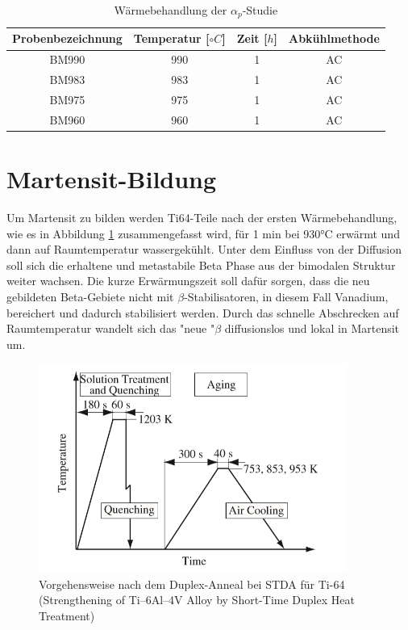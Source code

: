 \begin{table}
		\centering
	\begin{tabular}{|c|c|c|c|}
	\hline 
	Probenbezeichnung & Temperatur [$\circ C$] & Zeit [$h$] & Abkühlmethode \\ 
	\hline 
	BM990 & 990 & 1 & AC\\ 
	\hline 
	BM983 & 983 & 1 & AC\\ 
	\hline 
	BM975 & 975 & 1 & AC\\ 
	\hline 
	BM960 & 960 & 1 & AC\\ 
	\hline 
	\end{tabular} 
	\caption{Wärmebehandlung der $\alpha_p$-Studie}
	\label{tab:alphap}
\end{table}


\section{Martensit-Bildung}

Um Martensit zu bilden werden Ti64-Teile  nach der ersten Wärmebehandlung, wie es in Abbildung \ref{STDA} zusammengefasst wird, für 1 min  bei 930°C erwärmt und dann  auf Raumtemperatur wassergekühlt. Unter dem Einfluss von der Diffusion soll sich die erhaltene und metastabile Beta Phase aus der bimodalen Struktur weiter wachsen. Die kurze Erwärmungszeit soll dafür sorgen, dass die neu gebildeten Beta-Gebiete nicht mit $\beta$-Stabilisatoren, in diesem Fall Vanadium, bereichert  und dadurch stabilisiert werden. Durch das schnelle Abschrecken auf Raumtemperatur wandelt sich das "neue "$\beta$ diffusionslos und lokal in Martensit um.

\begin{figure}[H]
	\centering
	\includegraphics[width=0.9\textwidth]{Bilder/ts-stda}
	\caption{Vorgehensweise nach dem Duplex-Anneal bei STDA für Ti-64 (Strengthening of Ti–6Al–4V Alloy by Short-Time Duplex Heat Treatment)}
	\label{STDA}
\end{figure}

